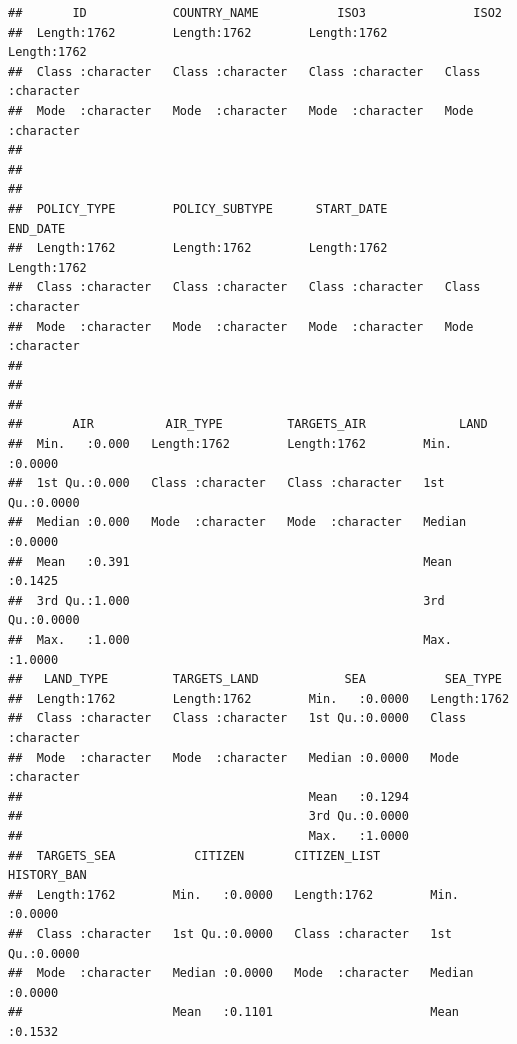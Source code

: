 \documentclass[]{article}
\begin{document}
\begin{verbatim}
##       ID            COUNTRY_NAME           ISO3               ISO2          
##  Length:1762        Length:1762        Length:1762        Length:1762       
##  Class :character   Class :character   Class :character   Class :character  
##  Mode  :character   Mode  :character   Mode  :character   Mode  :character  
##                                                                             
##                                                                             
##                                                                             
##  POLICY_TYPE        POLICY_SUBTYPE      START_DATE          END_DATE        
##  Length:1762        Length:1762        Length:1762        Length:1762       
##  Class :character   Class :character   Class :character   Class :character  
##  Mode  :character   Mode  :character   Mode  :character   Mode  :character  
##                                                                             
##                                                                             
##                                                                             
##       AIR          AIR_TYPE         TARGETS_AIR             LAND       
##  Min.   :0.000   Length:1762        Length:1762        Min.   :0.0000  
##  1st Qu.:0.000   Class :character   Class :character   1st Qu.:0.0000  
##  Median :0.000   Mode  :character   Mode  :character   Median :0.0000  
##  Mean   :0.391                                         Mean   :0.1425  
##  3rd Qu.:1.000                                         3rd Qu.:0.0000  
##  Max.   :1.000                                         Max.   :1.0000  
##   LAND_TYPE         TARGETS_LAND            SEA           SEA_TYPE        
##  Length:1762        Length:1762        Min.   :0.0000   Length:1762       
##  Class :character   Class :character   1st Qu.:0.0000   Class :character  
##  Mode  :character   Mode  :character   Median :0.0000   Mode  :character  
##                                        Mean   :0.1294                     
##                                        3rd Qu.:0.0000                     
##                                        Max.   :1.0000                     
##  TARGETS_SEA           CITIZEN       CITIZEN_LIST        HISTORY_BAN    
##  Length:1762        Min.   :0.0000   Length:1762        Min.   :0.0000  
##  Class :character   1st Qu.:0.0000   Class :character   1st Qu.:0.0000  
##  Mode  :character   Median :0.0000   Mode  :character   Median :0.0000  
##                     Mean   :0.1101                      Mean   :0.1532  

\end{verbatim}
\end{document}
